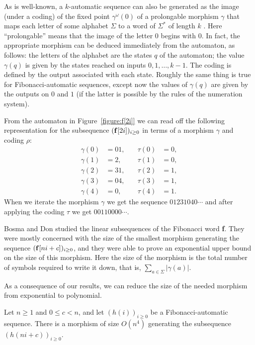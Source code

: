\documentclass[12pt,reqno]{article}
\begin{document}
As is well-known, a $k$-automatic sequence can also be generated as the image (under a coding) of the fixed point  $\gamma^\omega (0)$ of a prolongable morphism $\gamma$ that maps each letter of some alphabet $\Sigma$ to a word of $\Sigma^*$ of length $k$ \cite{allouche_automatic_2003}.   Here
``prolongable'' means that the image of the letter $0$ begins with $0$.
In fact, the appropriate morphism can be deduced immediately from the automaton, as follows:  the letters of the alphabet are the states $q$ of the automaton; the value $\gamma(q)$ is given by the states reached
on inputs $0, 1, \ldots , k-1$.  The coding is defined by the
output associated with each state.
Roughly the same thing is true for Fibonacci-automatic sequences, except now the values of 
$\gamma(q)$ are given by the outputs on
$0$ and $1$ (if the latter is possible by the
rules of the numeration system).
\begin{example}
 From the automaton in Figure~\ref{figure:f[2i]} we can read off the following representation for the subsequence $({\bf f}[2i])_{i \geq 0}$ in
    terms of a morphism $\gamma$ and coding $\rho$:
    \begin{align*}
    \gamma(0) &= 01,  & \quad \tau(0) &= 0, \\
    \gamma(1) &= 2, & \quad \tau(1) &= 0, \\
    \gamma(2) &= 31, & \quad \tau(2) &= 1, \\
    \gamma(3) &= 04, & \quad \tau(3) &= 1, \\
    \gamma(4) &= 0, & \quad \tau(4) &= 1 .
    \end{align*}
When we iterate the morphism $\gamma$ we get the sequence
$01231040\cdots$ and after applying the coding $\tau$ we get
$00110000\cdots$.
\end{example}



Bosma and Don \cite{bosma_constructing_2024} studied the  linear subsequences of the Fibonacci word {\bf f}.   They were mostly concerned with the size of the smallest morphism generating the sequence $({\bf f}[ni+c])_{i \geq 0}$,
and they were able to prove an exponential upper bound on the size of this morphism.  Here the size of the morphism is the total number of symbols
required to write it down, that is,
$\sum_{a \in \Sigma}  |\gamma(a)| $.

As a consequence of our results, we can reduce the size of the needed morphism from exponential to polynomial.

\begin{corollary}
Let $n \geq 1$ and $0 \leq c < n$, and let
$(h(i))_{i \geq 0}$ be a Fibonacci-automatic sequence.
There is a morphism of size
$O(n^4)$ generating the subsequence $(h(ni+c))_{i \geq 0}$.
\end{corollary}
\end{document}
